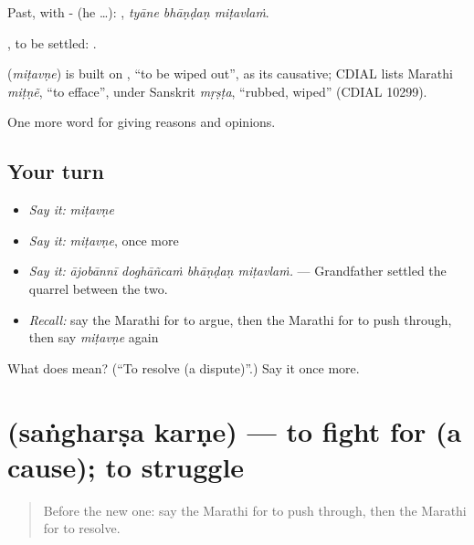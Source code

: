 Past, with - (he …):   , \emph{tyāne bhāṇḍaṇ miṭavlaṁ}.

, to be settled:  .

\begin{cousinweb}
\textbf{} (\emph{miṭavṇe}) is built on , \textquotedblleft{}to be wiped out\textquotedblright{}, as its causative; CDIAL lists Marathi \emph{miṭṇẽ}, \textquotedblleft{}to efface\textquotedblright{}, under Sanskrit \emph{mṛṣṭa}, \textquotedblleft{}rubbed, wiped\textquotedblright{} (CDIAL 10299).
\end{cousinweb}

\begin{grammarlens}[title={What you've built}]
One more word for giving reasons and opinions.
\end{grammarlens}

\subsection*{Your turn}
\begin{itemize}
\raggedright
  \item \emph{Say it:} \emph{miṭavṇe}
  \item \emph{Say it:} \emph{miṭavṇe}, once more
  \item \emph{Say it:} \emph{ājobānnī doghāñcaṁ bhāṇḍaṇ miṭavlaṁ.} — Grandfather settled the quarrel between the two.
  \item \emph{Recall:} say the Marathi for to argue, then the Marathi for to push through, then say \emph{miṭavṇe} again
\end{itemize}

\begin{tcolorbox}[breakable,colback=teal!4,colframe=teal!35!black,title={Before you move on}]
What does  mean? (\textquotedblleft{}To resolve (a dispute)\textquotedblright{}.) Say it once more.
\end{tcolorbox}
\section[\texorpdfstring{\mr{संघर्ष} \mr{करणे} (saṅgharṣa karṇe)}{संघर्ष करणे (saṅgharṣa karṇe)}]{  (saṅgharṣa karṇe) — to fight for (a cause); to struggle}

\label{lesson:MR-C365-sangharsa-karne}



\begin{quote}
Before the new one: say the Marathi for to push through, then the Marathi for to resolve.
\end{quote}

